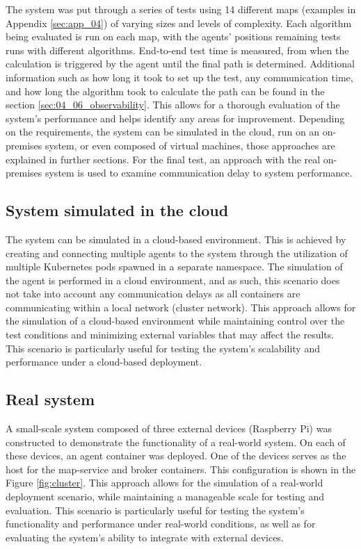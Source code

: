 The system was put through a series of tests using 14 different maps (examples in Appendix \ref{sec:app_04}) of varying sizes and levels of complexity. Each algorithm being evaluated is run on each map, with the agents' positions remaining tests runs with different algorithms. End-to-end test time is measured, from when the calculation is triggered by the agent until the final path is determined. Additional information such as how long it took to set up the test, any communication time, and how long the algorithm took to calculate the path can be found in the section \ref{sec:04_06_observability}. This allows for a thorough evaluation of the system's performance and helps identify any areas for improvement. Depending on the requirements, the system can be simulated in the cloud, run on an on-premises system, or even composed of virtual machines, those approaches are explained in further sections. For the final test, an approach with the real on-premises system is used to examine communication delay to system performance.

\subsection{System simulated in the cloud}
The system can be simulated in a cloud-based environment. This is achieved by creating and connecting multiple agents to the system through the utilization of multiple Kubernetes pods spawned in a separate namespace. The simulation of the agent is performed in a cloud environment, and as such, this scenario does not take into account any communication delays as all containers are communicating within a local network (cluster network). This approach allows for the simulation of a cloud-based environment while maintaining control over the test conditions and minimizing external variables that may affect the results. This scenario is particularly useful for testing the system's scalability and performance under a cloud-based deployment.

\subsection{Real system}
A small-scale system composed of three external devices (Raspberry Pi) was constructed to demonstrate the functionality of a real-world system. On each of these devices, an agent container was deployed. One of the devices serves as the host for the map-service and broker containers. This configuration is shown in the Figure \ref{fig:cluster}. This approach allows for the simulation of a real-world deployment scenario, while maintaining a manageable scale for testing and evaluation. This scenario is particularly useful for testing the system's functionality and performance under real-world conditions, as well as for evaluating the system's ability to integrate with external devices.

